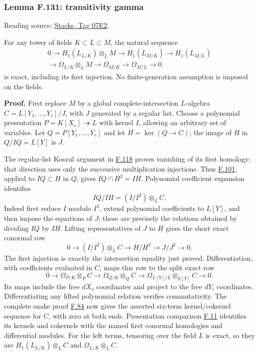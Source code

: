 \documentclass[11pt,a4paper,openany]{report}
\begin{document}
\label{AG-RG-S05-more-algebra-lemma-transitivity-gamma}

\subsubsection{Lemma F.131: transitivity gamma}\label{AG-RG-S05-lemma-f.131-transitivity-gamma}

Reading source: \href{https://stacks.math.columbia.edu/tag/07E2}{Stacks, Tag 07E2}.

For any tower of fields \(K\subset L\subset M\), the natural sequence \[
\begin{gathered}
0\longrightarrow H_1(L_{L/K})\otimes_LM
\longrightarrow H_1(L_{M/K})\longrightarrow H_1(L_{M/L})\\
\longrightarrow\Omega_{L/K}\otimes_LM
\longrightarrow\Omega_{M/K}\longrightarrow\Omega_{M/L}\longrightarrow0.
\end{gathered}
\] is exact, including its first injection. No finite-generation assumption is imposed on the fields.

\textbf{Proof.} First replace \(M\) by a global complete-intersection \(L\)-algebra \(C=L[Y_1,\ldots,Y_r]/J\), with \(J\) generated by a regular list. Choose a polynomial presentation \(P=K[X_s]\twoheadrightarrow L\) with kernel \(I\), allowing an arbitrary set of variables. Let \(Q=P[Y_1,\ldots,Y_r]\) and let \(H=\ker(Q\to C)\); the image of \(H\) in \(Q/IQ=L[Y]\) is \(J\).

The regular-list Koszul argument in \hyperref[AG-RG-S05-more-algebra-lemma-noetherian-finite-all-equivalent]{F.118} proves vanishing of its first homology; that direction uses only the successive multiplication injections. Thus \hyperref[AG-RG-S05-more-algebra-lemma-conormal-sequence-H1-regular-ideal]{F.101}, applied to \(IQ\subset H\) in \(Q\), gives \(IQ\cap H^2=IH\). Polynomial coefficient expansion identifies \[
IQ/IH=(I/I^2)\otimes_L C.
\] Indeed first reduce \(I\) modulo \(I^2\), extend polynomial coefficients to \(L[Y]\), and then impose the equations of \(J\); these are precisely the relations obtained by dividing \(IQ\) by \(IH\). Lifting representatives of \(J\) to \(H\) gives the short exact conormal row \[
0\longrightarrow (I/I^2)\otimes_L C
\longrightarrow H/H^2\longrightarrow J/J^2\longrightarrow0.
\] The first injection is exactly the intersection equality just proved. Differentiation, with coefficients evaluated in \(C\), maps this row to the split exact row \[
0\longrightarrow\Omega_{P/K}\otimes_P C
\longrightarrow\Omega_{Q/K}\otimes_Q C
\longrightarrow\Omega_{L[Y]/L}\otimes_{L[Y]}C\longrightarrow0.
\] Its maps include the free \(dX_s\) coordinates and project to the free \(dY_i\) coordinates. Differentiating any lifted polynomial relation verifies commutativity. The complete snake proof \hyperref[AG-RG-S05-algebra-lemma-snake]{F.84} now gives the asserted six-term kernel/cokernel sequence for \(C\), with zero at both ends. Presentation comparison \hyperref[AG-RG-S05-algebra-lemma-NL-homotopy]{F.11} identifies its kernels and cokernels with the named first conormal homologies and differential modules. For the left terms, tensoring over the field \(L\) is exact, so they are \(H_1(L_{L/K})\otimes_L C\) and \(\Omega_{L/K}\otimes_L C\).
\end{document}
